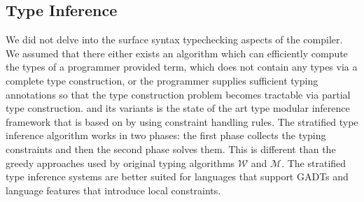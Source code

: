 \documentclass[screen,nonacm,manuscript,review]{acmart} %
\begin{document}
\subsection{Type Inference}\label{sec:rw-type-inf}
We did not delve into the surface syntax typechecking aspects of the
compiler. We assumed that there either exists an algorithm which can
efficiently compute the types of a programmer provided term, which
does not contain any types via a complete type
construction\cite{milner_theory_1978}, or the  programmer supplies
sufficient typing annotations so that the type construction problem
becomes tractable via partial type
construction\cite{pierce_local_2000, dunfield_bidirectional_2021}.
\HMX and its variants is the state of the art type modular inference
framework that is based on by using constraint handling rules. The
stratified type inference algorithm\cite{pottier_stratified_2006} works in two
phases: the first phase collects the typing constraints and then the
second phase solves them. This is different than the greedy approaches
used by original typing algorithms\cite{lee_proofs_1998} $\mathcal{W}$
and $\mathcal{M}$. The stratified type inference systems are better
suited for languages that support GADTs and language features that
introduce local constraints\cite{vytiniotis_outsideinx_2011}.
\end{document}
